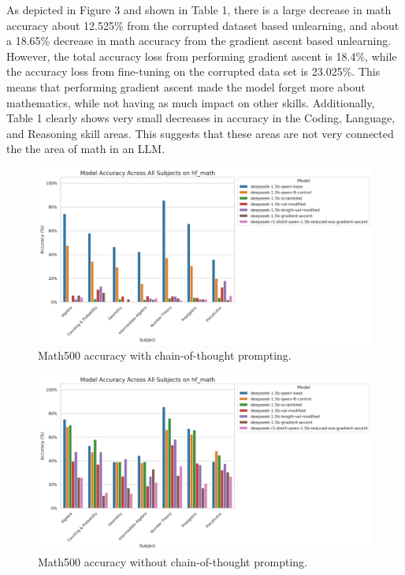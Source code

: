 \documentclass[10.5pt]{article}
\begin{document}
As depicted in Figure 3 and shown in Table 1, there is a large decrease in math accuracy about 12.525\% from the corrupted dataset based unlearning, and about a 18.65\% decrease in math accuracy from the gradient ascent based unlearning. However, the total accuracy loss from performing gradient ascent is 18.4\%, while the accuracy loss from fine-tuning on the corrupted data set is 23.025\%. This means that performing gradient ascent made the model forget more about mathematics, while not having as much impact on other skills. Additionally, Table 1 clearly shows very small decreases in accuracy in the Coding, Language, and Reasoning skill areas. This suggests that these areas are not very connected the the area of math in an LLM.
\begin{figure}[h]
    \centering
    \includegraphics[width=0.9\linewidth]{main_prompt_hf_math_accuracy_all_subjects_combined_20250505_042444.png}
    \caption{Math500 accuracy with chain-of-thought prompting.}
    \label{fig:math500_cot}
\end{figure}
\begin{figure}[h]
    \centering
    \includegraphics[width=0.9\linewidth]{new_prompt_hf_math_accuracy_all_subjects_combined_20250505_210815.png}
    \caption{Math500 accuracy without chain-of-thought prompting.}
    \label{fig:math500_cot}
\end{figure}
\end{document}

